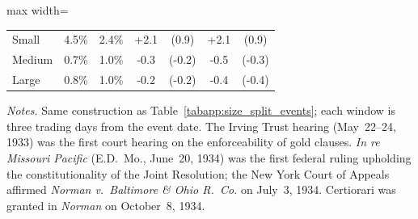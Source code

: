\begin{table}[htbp]
\begin{adjustbox}{max width=\textwidth}
\begin{tabular}{lcccccc}
\quad Small & 4.5\% & 2.4\% & +2.1 & (0.9) & +2.1 & (0.9) \\
\quad Medium & 0.7\% & 1.0\% & -0.3 & (-0.2) & -0.5 & (-0.3) \\
\quad Large & 0.8\% & 1.0\% & -0.2 & (-0.2) & -0.4 & (-0.4) \\
\bottomrule
\end{tabular}
\end{adjustbox}
\medskip
\begin{minipage}{0.95\textwidth}\footnotesize \textit{Notes.} Same construction as Table~\ref{tabapp:size_split_events}; each window is three trading days from the event date. The Irving Trust hearing (May~22--24, 1933) was the first court hearing on the enforceability of gold clauses. \textit{In re Missouri Pacific} (E.D.~Mo., June~20, 1934) was the first federal ruling upholding the constitutionality of the Joint Resolution; the New York Court of Appeals affirmed \textit{Norman v.\ Baltimore \& Ohio R.~Co.} on July~3, 1934. Certiorari was granted in \textit{Norman} on October~8, 1934.\end{minipage}
\end{table}

